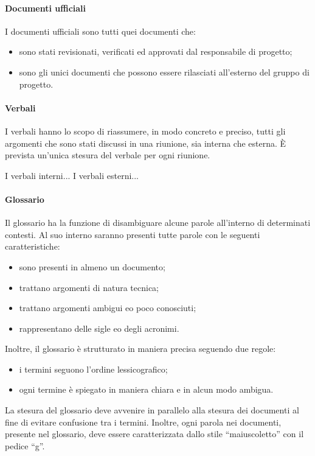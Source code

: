 			\paragraph{Documenti ufficiali}
				I documenti ufficiali sono tutti quei documenti che:
				\begin{itemize}
					\item sono stati revisionati, verificati ed approvati dal responsabile di progetto;
					\item sono gli unici documenti che possono essere rilasciati all'esterno del gruppo di progetto.
				\end{itemize}
			\paragraph{Verbali}
				I verbali hanno lo scopo di riassumere, in modo concreto e preciso, tutti gli argomenti che sono stati discussi in una riunione, sia interna che esterna. È prevista un'unica stesura del verbale per ogni riunione.

				I verbali interni...
				I verbali esterni...
			\paragraph{Glossario}
				Il glossario ha la funzione di disambiguare alcune parole all'interno di determinati contesti. Al suo interno saranno presenti tutte parole con le seguenti caratteristiche:
				\begin{itemize}
					\item sono presenti in almeno un documento;
					\item trattano argomenti di natura tecnica;
					\item trattano argomenti ambigui e\/o poco conosciuti;
					\item rappresentano delle sigle e\/o degli acronimi.
				\end{itemize}
				Inoltre, il glossario è strutturato in maniera precisa seguendo due regole:
				\begin{itemize}
					\item i termini seguono l'ordine lessicografico;
					\item ogni termine è spiegato in maniera chiara e in alcun modo ambigua.
				\end{itemize}
				La stesura del glossario deve avvenire in parallelo alla stesura dei documenti al fine di evitare confusione tra i termini. Inoltre, ogni parola nei documenti, presente nel glossario, deve essere caratterizzata dallo stile ``maiuscoletto'' con il pedice ``g''.
